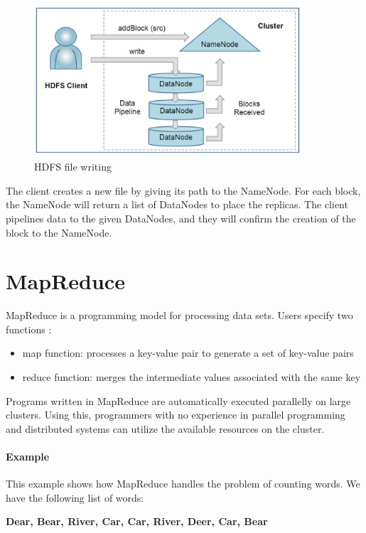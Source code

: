 \begin{figure}[H]
	\includegraphics[width=100mm, keepaspectratio]{figures/hdfs_client.png}
	\centering
	\caption{HDFS file writing}
\end{figure}
The client creates a new file by giving its path to the NameNode. For each block, the NameNode will return a list of DataNodes to place the replicas. The client pipelines data to the given DataNodes, and they will confirm the creation of the block to the NameNode.
\clearpage
\section{MapReduce}
MapReduce is a programming model for processing data sets. Users specify two functions \cite{Dean:2004:MSD:1251254.1251264}:
\begin{itemize}
	\item map function: processes a key-value pair to generate a set of key-value pairs
	\item reduce function: merges the intermediate values associated with the same key
\end{itemize}

Programs written in MapReduce are automatically executed parallelly on large clusters. Using this, programmers with no experience in parallel programming and distributed systems can utilize the available resources on the cluster.
\paragraph{Example \cite{MapReduce-example}}
This example shows how MapReduce handles the problem of counting words. We have the following list of words: 
\begin{center}
	\textbf{Dear, Bear, River, Car, Car, River, Deer, Car, Bear}
\end{center}

